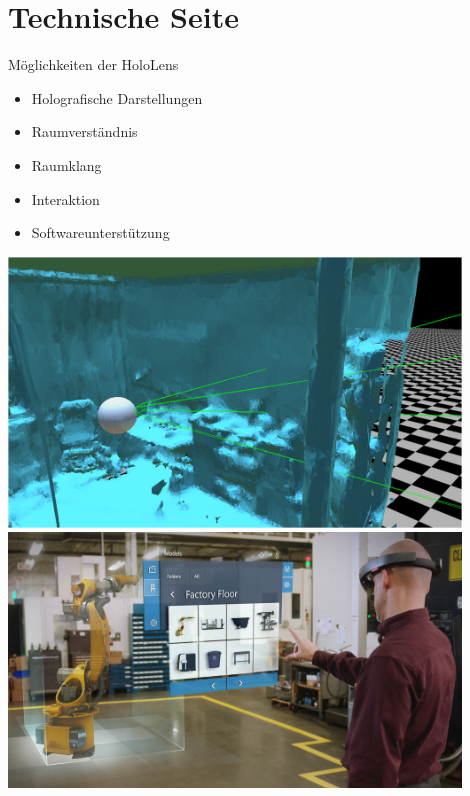 \part{Technische Seite}
\label{part:tech}
\begin{frame}[fragile]{Möglichkeiten der HoloLens}
\begin{minipage}{0.5\textwidth}
	{
		\begin{itemize}[itemsep=1mm]
			\item Holografische Darstellungen
			\item Raumverständnis
			\item Raumklang
			\item Interaktion
			\item Softwareunterstützung
		\end{itemize}
	}
\end{minipage}
\begin{minipage}{0.48\textwidth}
	\includegraphics[width=0.9\textwidth]{images/Spatial_Understanding.png}
	\includegraphics[width=0.9\textwidth]{images/HoloLens_Factory_Floor.jpg}
\end{minipage}
\end{frame}

